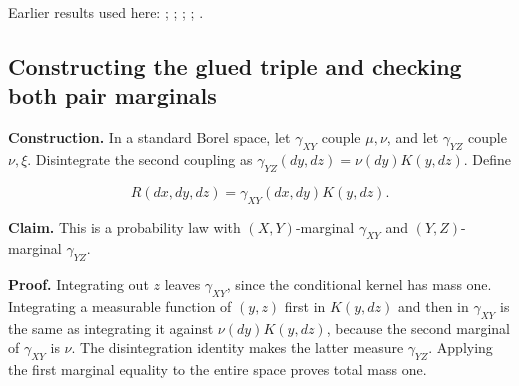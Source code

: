 \documentclass[11pt,a4paper]{report}
\begin{document}
Earlier results used here: \cite[Section~3.17.1]{LangevinLean2026ULASC}; \cite[Section~3.17.2]{LangevinLean2026ULASC}; \cite[Section~3.17.3]{LangevinLean2026ULASC}; \cite[Section~3.17.4]{LangevinLean2026ULASC}; \cite[Section~3.17.5]{LangevinLean2026ULASC}.
\subsection{\texorpdfstring{Constructing the glued triple and checking both pair marginals}{Constructing the glued triple and checking both pair marginals}}
\label{report-step-WassersteinMixing-TransportGeometry-lean-2}


\textbf{Construction.} In a standard Borel space, let \(\gamma_{XY}\) couple \(\mu,\nu\), and let \(\gamma_{YZ}\) couple \(\nu,\xi\). Disintegrate the second coupling as \(\gamma_{YZ}(dy,dz)=\nu(dy)K(y,dz)\). Define

\[R(dx,dy,dz)=\gamma_{XY}(dx,dy)K(y,dz).\]


\textbf{Claim.} This is a probability law with \((X,Y)\)-marginal \(\gamma_{XY}\) and \((Y,Z)\)-marginal \(\gamma_{YZ}\).




\textbf{Proof.} Integrating out \(z\) leaves \(\gamma_{XY}\), since the conditional kernel has mass one. Integrating a measurable function of \((y,z)\) first in \(K(y,dz)\) and then in \(\gamma_{XY}\) is the same as integrating it against \(\nu(dy)K(y,dz)\), because the second marginal of \(\gamma_{XY}\) is \(\nu\). The disintegration identity makes the latter measure \(\gamma_{YZ}\). Applying the first marginal equality to the entire space proves total mass one.
\end{document}
